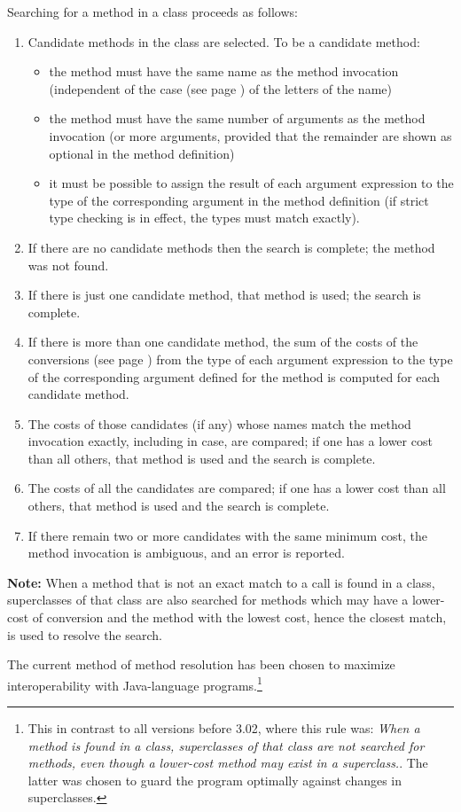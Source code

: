 Searching for a method in a class proceeds as follows:
\begin{enumerate}
\item 
Candidate methods in the class are selected.
To be a candidate method:
\begin{itemize}
\item 
the method must have the same name as the method invocation (independent
of the  case (see page \pageref{refcase})  of the letters of the name)
\item 
the method must have the same number of arguments as the method
invocation (or more arguments, provided that the remainder are shown as
optional in the method definition)
\item 
it must be possible to assign the result of each argument expression to
the type of the corresponding argument in the method definition (if
strict type checking is in effect, the types must match exactly).
\end{itemize}
\item 
If there are no candidate methods then the search is complete; the
method was not found.
\item If there is just one candidate method, that method is used; the
search is complete.
\item 
If there is more than one candidate method, the sum of the
 costs of the conversions (see page \pageref{refcosts})  from the type of each
argument expression to the type of the corresponding argument defined
for the method is computed for each candidate method.
\item 
The costs of those candidates (if any) whose names match the method
invocation exactly, including in case, are compared; if one has a lower
cost than all others, that method is used and the search is complete.
\item 
The costs of all the candidates are compared; if one has a lower
cost than all others, that method is used and the search is complete.
\item 
If there remain two or more candidates with the same minimum cost, the
method invocation is ambiguous, and an error is reported.
\end{enumerate}
\begin{shaded}\noindent
\textbf{Note: }When a method that is not
an exact match to a call is found in a class, superclasses of that
class are also searched for methods which may have a lower-cost of
conversion and the method with the lowest cost, hence the closest
match, is used to resolve the search.
\end{shaded}\indent
The current method of method resolution has been chosen to maximize interoperability with
Java-language programs.\footnote{This in contrast to all
  versions before 3.02, where this rule was: \emph{When a method is
    found in a class, superclasses of that class are not searched for
    methods, even though a lower-cost method may exist in a
    superclass.}. The latter was chosen to guard the program optimally against changes in superclasses.}
